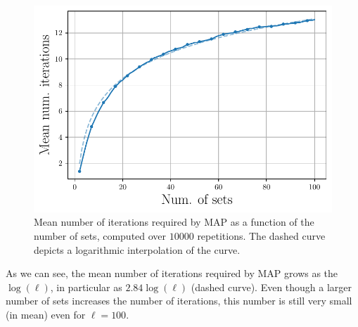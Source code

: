 \documentclass{article}
\begin{document}
\begin{figure}[ht]
\vskip 0.2in
\begin{center}
\centerline{\includegraphics[width=\columnwidth]{Figures/MAP_changing_d}}
\caption{Mean number of iterations required by MAP as a function of the number of sets, computed over $10000$ repetitions. The dashed curve depicts a logarithmic interpolation of the curve.}
\label{fig:map-changing-d}
\end{center}
\vskip -0.2in
\end{figure}

As we can see, the mean number of iterations required by MAP grows as the $\log(\ell)$, in particular as $2.84 \log(\ell)$ (dashed curve). Even though a larger number of sets increases the number of iterations, this number is still very small (in mean) even for $\ell = 100$.





\end{document}
